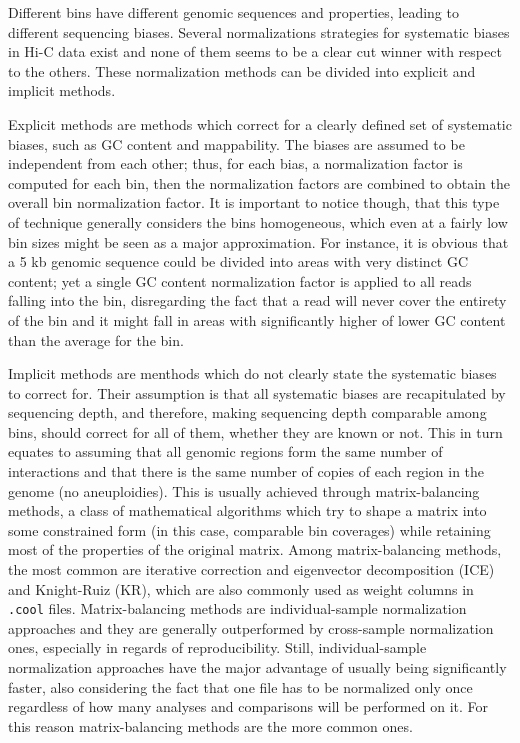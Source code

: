 Different bins have different genomic sequences and properties, leading to different sequencing biases. Several normalizations strategies for systematic biases in Hi-C data exist and none of them seems to be a clear cut winner with respect to the others\cite{normalization2020}. These normalization methods can be divided into explicit and implicit methods. 

Explicit methods are methods which correct for a clearly defined set of systematic biases, such as GC content and mappability. The biases are assumed to be independent from each other; thus, for each bias, a normalization factor is computed for each bin, then the normalization factors are combined to obtain the overall bin normalization factor. It is important to notice though, that this type of technique generally considers the bins homogeneous, which even at a fairly low bin sizes might be seen as a major approximation. For instance, it is obvious that a 5 kb genomic sequence could be divided into areas with very distinct GC content; yet a single GC content normalization factor is applied to all reads falling into the bin, disregarding the fact that a read will never cover the entirety of the bin and it might fall in areas with significantly higher of lower GC content than the average for the bin.

Implicit methods are menthods which do not clearly state the systematic biases to correct for. Their assumption is that all systematic biases are recapitulated by sequencing depth, and therefore, making sequencing depth comparable among bins, should correct for all of them, whether they are known or not. This in turn equates to assuming that all genomic regions form the same number of interactions and that there is the same number of copies of each region in the genome (no aneuploidies). This is usually achieved through matrix-balancing methods, a class of mathematical algorithms which try to shape a matrix into some constrained form (in this case, comparable bin coverages) while retaining most of the properties of the original matrix. Among matrix-balancing methods, the most common are iterative correction and eigenvector decomposition (ICE)\cite{ice2012} and Knight-Ruiz (KR)\cite{knightruiz2012}, which are also commonly used as weight columns in \texttt{.cool} files. Matrix-balancing methods are individual-sample normalization approaches and they are generally outperformed by cross-sample normalization ones, especially in regards of reproducibility. Still, individual-sample normalization approaches have the major advantage of usually being significantly faster, also considering the fact that one file has to be normalized only once regardless of how many analyses and comparisons will be performed on it. For this reason matrix-balancing methods are the more common ones.

